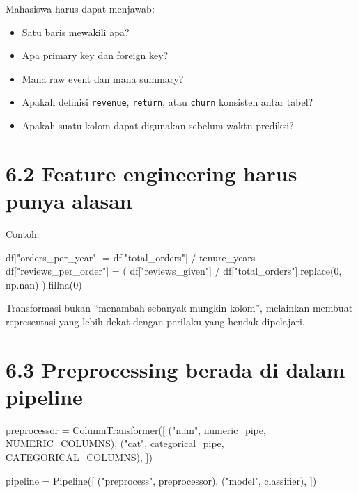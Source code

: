 \documentclass[
  indonesian,
  letterpaper,
  DIV=11,
  numbers=noendperiod]{scrreprt}
\newenvironment{Shaded}{\begin{snugshade}}{\end{snugshade}}
\newcommand{\DecValTok}[1]{\textcolor[rgb]{0.68,0.00,0.00}{#1}}
\newcommand{\NormalTok}[1]{\textcolor[rgb]{0.00,0.23,0.31}{#1}}
\newcommand{\OperatorTok}[1]{\textcolor[rgb]{0.37,0.37,0.37}{#1}}
\newcommand{\StringTok}[1]{\textcolor[rgb]{0.13,0.47,0.30}{#1}}
\providecommand{\tightlist}{%
  \setlength{\itemsep}{0pt}\setlength{\parskip}{0pt}}
\begin{document}
Mahasiswa harus dapat menjawab:

\begin{itemize}
\tightlist
\item
  Satu baris mewakili apa?
\item
  Apa primary key dan foreign key?
\item
  Mana raw event dan mana summary?
\item
  Apakah definisi \texttt{revenue}, \texttt{return}, atau \texttt{churn}
  konsisten antar tabel?
\item
  Apakah suatu kolom dapat digunakan sebelum waktu prediksi?
\end{itemize}

\section{6.2 Feature engineering harus punya
alasan}\label{feature-engineering-harus-punya-alasan}

Contoh:

\begin{Shaded}
\begin{Highlighting}[]
\NormalTok{df[}\StringTok{"orders\_per\_year"}\NormalTok{] }\OperatorTok{=}\NormalTok{ df[}\StringTok{"total\_orders"}\NormalTok{] }\OperatorTok{/}\NormalTok{ tenure\_years}
\NormalTok{df[}\StringTok{"reviews\_per\_order"}\NormalTok{] }\OperatorTok{=}\NormalTok{ (}
\NormalTok{    df[}\StringTok{"reviews\_given"}\NormalTok{] }\OperatorTok{/}\NormalTok{ df[}\StringTok{"total\_orders"}\NormalTok{].replace(}\DecValTok{0}\NormalTok{, np.nan)}
\NormalTok{).fillna(}\DecValTok{0}\NormalTok{)}
\end{Highlighting}
\end{Shaded}

Transformasi bukan ``menambah sebanyak mungkin kolom'', melainkan
membuat representasi yang lebih dekat dengan perilaku yang hendak
dipelajari.

\section{6.3 Preprocessing berada di dalam
pipeline}\label{preprocessing-berada-di-dalam-pipeline}

\begin{Shaded}
\begin{Highlighting}[]
\NormalTok{preprocessor }\OperatorTok{=}\NormalTok{ ColumnTransformer([}
\NormalTok{    (}\StringTok{"num"}\NormalTok{, numeric\_pipe, NUMERIC\_COLUMNS),}
\NormalTok{    (}\StringTok{"cat"}\NormalTok{, categorical\_pipe, CATEGORICAL\_COLUMNS),}
\NormalTok{])}

\NormalTok{pipeline }\OperatorTok{=}\NormalTok{ Pipeline([}
\NormalTok{    (}\StringTok{"preprocess"}\NormalTok{, preprocessor),}
\NormalTok{    (}\StringTok{"model"}\NormalTok{, classifier),}
\NormalTok{])}
\end{Highlighting}
\end{Shaded}
\end{document}
